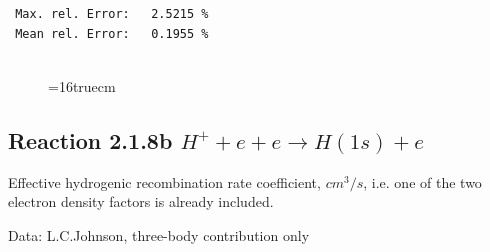 \documentclass[12pt,dvips]{article}
\begin{document}
\begin{small}
\begin{verbatim}
 Max. rel. Error:   2.5215 %
 Mean rel. Error:   0.1955 %


\end{verbatim}\end{small}
\begin{figure} \label{2.1.8a}
\epsfxsize=16truecm
\end{figure}
\newpage

\subsection{
  Reaction 2.1.8b  $H^+ + e + e \rightarrow H(1s) + e$
}

   Effective hydrogenic recombination rate coefficient, $cm^3/s$,
   i.e. one of the two electron density factors is already included.

   Data: L.C.Johnson, three-body contribution only
\end{document}
